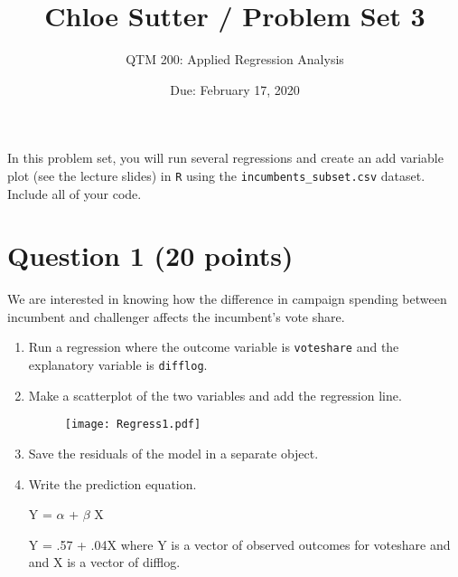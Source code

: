 \documentclass[12pt,letterpaper]{article}
\title{Chloe Sutter / Problem Set 3}
\date{Due: February 17, 2020}
\author{QTM 200: Applied Regression Analysis}
\begin{document}
\maketitle	
\noindent In this problem set, you will run several regressions and create an add variable plot (see the lecture slides) in \texttt{R} using the \texttt{incumbents\_subset.csv} dataset. Include all of your code.

	\vspace{.5cm}
	\section*{Question 1 (20 points)}
	\vspace{.25cm}
	\noindent We are interested in knowing how the difference in campaign spending between incumbent and challenger affects the incumbent's vote share. 
	\begin{enumerate}
		\item Run a regression where the outcome variable is \texttt{voteshare} and the explanatory variable is \texttt{difflog}.
		  
		\vspace{.25cm}
		
		\item Make a scatterplot of the two variables and add the regression line. 
		  
		\vspace{.25cm}
		
		\newpage
		
		\begin{figure}[h!]\centering
		\caption{\footnotesize }
		\label{fig:plot_1}
		\texttt{[image: Regress1.pdf]}
		\end{figure}
		\vspace{.25cm}
		
		\item Save the residuals of the model in a separate object.	
		  
		\vspace{.25cm}
		
		\item Write the prediction equation.
		\vspace{.15cm}
		
		Y = $\alpha$ + $\beta$ X
		
		\vspace{.1cm}
		
		Y = .57 + .04X where Y is a vector of observed outcomes for voteshare and and X is a vector of difflog. 
		
	\end{enumerate}
	
\end{document}
